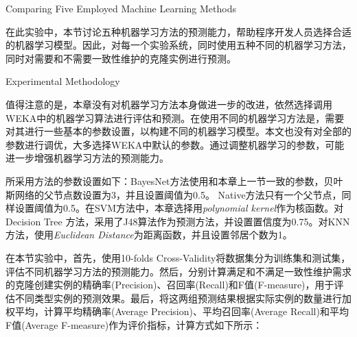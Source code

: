{Comparing Five Employed Machine Learning Methods}
\label{ref-creatingmethodmetrics}

在此实验中，本节讨论五种机器学习方法的预测能力，帮助程序开发人员选择合适的机器学习模型。因此，对每一个实验系统，同时使用五种不同的机器学习方法，同时对需要和不需要一致性维护的克隆实例进行预测。

{Experimental Methodology}

值得注意的是，本章没有对机器学习方法本身做进一步的改进，依然选择调用WEKA中的机器学习算法进行评估和预测。在使用不同的机器学习方法是，需要对其进行一些基本的参数设置，以构建不同的机器学习模型。本文也没有对全部的参数进行调优，大多选择WEKA中默认的参数。通过调整机器学习的参数，可能进一步增强机器学习方法的预测能力。

所采用方法的参数设置如下：BayesNet方法使用和本章上一节一致的参数，贝叶斯网络的父节点数设置为3，并且设置阈值为0.5。 Native方法只有一个父节点，同样设置阈值为0.5。在SVM方法中，本章选择用{\em polynomial kernel\/}作为核函数。对Decision Tree 方法，采用了J48算法作为预测方法，并设置置信度为0.75。对KNN方法，使用{\em Euclidean Distance\/}为距离函数，并且设置邻居个数为1。

在本节实验中，首先，使用10-folds Cross-Validity将数据集分为训练集和测试集，评估不同机器学习方法的预测能力。然后，分别计算满足和不满足一致性维护需求的克隆创建实例的精确率(Precision)、召回率(Recall)和F值(F-measure)，用于评估不同类型实例的预测效果。最后，将这两组预测结果根据实际实例的数量进行加权平均，计算平均精确率(Average Precision)、平均召回率(Average Recall)和平均F值(Average F-measure)作为评价指标，计算方式如下所示：

